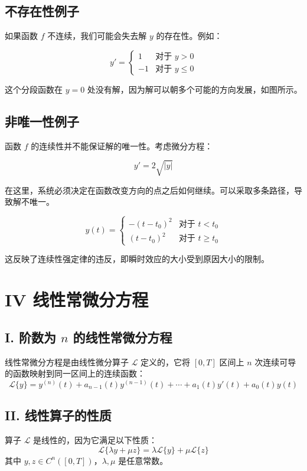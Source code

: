 \documentclass{ctexart}
\begin{document}
\subsection*{不存在性例子}
如果函数 \( f \) 不连续，我们可能会失去解 \( y \) 的存在性。例如：

\[
y' = 
\begin{cases} 
1 & \text{对于 } y > 0 \\
-1 & \text{对于 } y \leq 0
\end{cases}
\]

这个分段函数在 \( y=0 \) 处没有解，因为解可以朝多个可能的方向发展，如图所示。

\subsection*{非唯一性例子}
函数 \( f \) 的连续性并不能保证解的唯一性。考虑微分方程：

\[
y' = 2 \sqrt{|y|}
\]

在这里，系统必须决定在函数改变方向的点之后如何继续。可以采取多条路径，导致解不唯一。

\[
y(t) = 
\begin{cases} 
-(t-t_0)^2 & \text{对于 } t < t_0 \\
(t-t_0)^2 & \text{对于 } t \geq t_0
\end{cases}
\]

这反映了连续性强定律的违反，即瞬时效应的大小受到原因大小的限制。




\section*{IV 线性常微分方程}

\subsection*{I. 阶数为 \( n \) 的线性常微分方程}
线性常微分方程是由线性微分算子 \( \mathcal{L} \) 定义的，它将 \( [0,T] \) 区间上 \( n \) 次连续可导的函数映射到同一区间上的连续函数：
\[
\mathcal{L}\{y\} = y^{(n)}(t) + a_{n-1}(t)y^{(n-1)}(t) + \cdots + a_1(t)y'(t) + a_0(t)y(t)
\]

\subsection*{II. 线性算子的性质}
算子 \( \mathcal{L} \) 是线性的，因为它满足以下性质：
\[
\mathcal{L}\{\lambda y + \mu z\} = \lambda \mathcal{L}\{y\} + \mu \mathcal{L}\{z\}
\]
其中 \( y,z \in C^n([0,T]) \)，\( \lambda, \mu \) 是任意常数。
\end{document}

